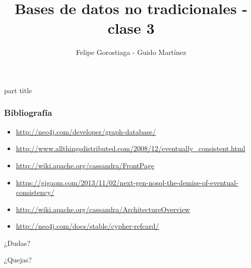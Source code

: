 \documentclass[obeyspaces,spaces,hyphens]{beamer}
\begin{document}
\title{Bases de datos no tradicionales - clase 3}
\author{Felipe Gorostiaga - Guido Martínez}

\begin{frame}
  \titlepage
\end{frame}

\AtBeginSection{\frame{\sectionpage}}

{
	\begin{centering}
	\begin{beamercolorbox}[sep=12pt,center]{part title}
	\bf{\insertsection}\par
	\end{beamercolorbox}
	\end{centering}
}

\newcommand{\dquote}{\texttt{\char`\"}}





\begin{frame}
\frametitle{Bibliografía}
\begin{itemize}
	\footnotesize
	\item \url{http://neo4j.com/developer/graph-database/}
	\item \url{http://www.allthingsdistributed.com/2008/12/eventually\_consistent.html}
	\item \url{http://wiki.apache.org/cassandra/FrontPage}
	\item \url{https://gigaom.com/2013/11/02/next-gen-nosql-the-demise-of-eventual-consistency/}
	\item \url{http://wiki.apache.org/cassandra/ArchitectureOverview}
	\item \url{http://neo4j.com/docs/stable/cypher-refcard/}
\end{itemize}
\end{frame}

\begin{frame}
\begin{center}
	¿Dudas?
	\pause

	¿Quejas?
\end{center}
\end{frame}
\end{document}
